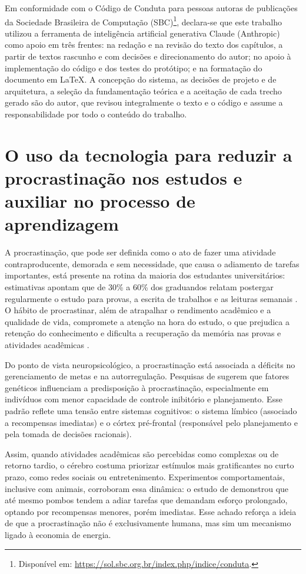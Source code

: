 \documentclass[12pt, %
openright, 
oneside,
a4paper,
english,   %
brazil]{facom-ufu-abntex2}
\begin{document}
Em conformidade com o Código de Conduta para pessoas autoras de publicações
da Sociedade Brasileira de Computação (SBC)\footnote{Disponível em:
\url{https://sol.sbc.org.br/index.php/indice/conduta}.}, declara-se que este
trabalho utilizou a ferramenta de inteligência artificial generativa Claude
(Anthropic) como apoio em três frentes: na redação e na revisão do texto dos
capítulos, a partir de textos rascunho e com decisões e direcionamento do autor; no
apoio à implementação do código e dos testes do protótipo; e na formatação
do documento em \LaTeX. A concepção do sistema, as decisões de projeto e de
arquitetura, a seleção da fundamentação teórica e a aceitação de cada trecho
gerado são do autor, que revisou integralmente o texto e o código e assume a
responsabilidade por todo o conteúdo do trabalho.

\chapter{O uso da tecnologia para reduzir a procrastinação nos estudos e auxiliar no processo de aprendizagem}
\label{cap:fundamentacao}

A procrastinação, que pode ser definida como o ato de fazer uma atividade
contraproducente, demorada e sem necessidade, que causa o adiamento de tarefas
importantes, está presente na rotina da maioria dos estudantes universitários:
estimativas apontam que de 30\% a 60\% dos graduandos relatam postergar
regularmente o estudo para provas, a escrita de trabalhos e as leituras
semanais \cite{AcademicProcrastinationInCollegeStudents}. O hábito de
procrastinar, além de atrapalhar o rendimento acadêmico e a qualidade de vida,
compromete a atenção na hora do estudo, o que prejudica a retenção do
conhecimento e dificulta a recuperação da memória nas provas e atividades
acadêmicas \cite{AcademicProcrastinationInCollegeStudents}.

Do ponto de vista neuropsicológico, a procrastinação está associada a déficits
no gerenciamento de metas e na autorregulação. Pesquisas de
 sugerem que fatores
genéticos influenciam a predisposição à procrastinação, especialmente em
indivíduos com menor capacidade de controle inibitório e planejamento. Esse
padrão reflete uma tensão entre sistemas cognitivos: o sistema límbico
(associado a recompensas imediatas) e o córtex pré-frontal (responsável pelo
planejamento e pela tomada de decisões racionais).

Assim, quando atividades acadêmicas são percebidas como complexas ou de
retorno tardio, o cérebro costuma priorizar estímulos mais gratificantes no
curto prazo, como redes sociais ou entretenimento. Experimentos
comportamentais, inclusive com animais, corroboram essa dinâmica: o estudo de
 demonstrou que até mesmo pombos tendem a adiar tarefas
que demandam esforço prolongado, optando por recompensas menores, porém
imediatas. Esse achado reforça a ideia de que a procrastinação não é
exclusivamente humana, mas sim um mecanismo ligado à economia de energia.
\end{document}
